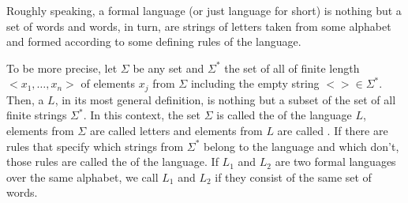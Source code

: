 Roughly speaking, a formal language (or just language for short) is nothing but a set of words and words, in turn, are strings of letters taken from some alphabet and formed according to some defining rules of the language. 

To be more precise, let $\Sigma$ be any set and $\Sigma^*$ the set of all  of finite length $<x_1,\ldots,x_n>$ of elements $x_j$ from $\Sigma$ including the empty string $<>\in \Sigma^*$. Then, a  $L$, in its most general definition, is nothing but a subset of the set of all finite strings $\Sigma^*$. In this context, the set $\Sigma$ is called the  of the language $L$, elements from $\Sigma$ are called letters and elements from $L$ are called . If there are rules that specify which strings from $\Sigma^*$ belong to the language and which don't, those rules are called the  of the language. If $L_1$ and $L_2$ are two formal languages over the same alphabet, we call $L_1$ and $L_2$  if they consist of the same set of words.

